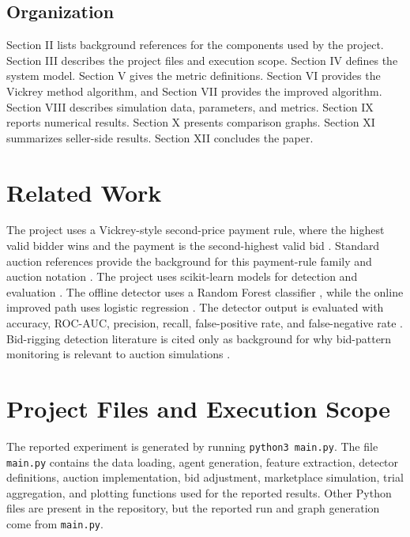 \documentclass[conference]{IEEEtran}
\begin{document}
\subsection{Organization}
Section II lists background references for the components used by the project. Section III describes the project files and execution scope. Section IV defines the system model. Section V gives the metric definitions. Section VI provides the Vickrey method algorithm, and Section VII provides the improved algorithm. Section VIII describes simulation data, parameters, and metrics. Section IX reports numerical results. Section X presents comparison graphs. Section XI summarizes seller-side results. Section XII concludes the paper.

\section{Related Work}
The project uses a Vickrey-style second-price payment rule, where the highest valid bidder wins and the payment is the second-highest valid bid \cite{b1}. Standard auction references provide the background for this payment-rule family and auction notation \cite{b4,b5,b6,b7,b8}. The project uses scikit-learn models for detection and evaluation \cite{b2}. The offline detector uses a Random Forest classifier \cite{b9}, while the online improved path uses logistic regression \cite{b10}. The detector output is evaluated with accuracy, ROC-AUC, precision, recall, false-positive rate, and false-negative rate \cite{b3}. Bid-rigging detection literature is cited only as background for why bid-pattern monitoring is relevant to auction simulations \cite{b11}.

\section{Project Files and Execution Scope}
The reported experiment is generated by running \texttt{python3 main.py}. The file \texttt{main.py} contains the data loading, agent generation, feature extraction, detector definitions, auction implementation, bid adjustment, marketplace simulation, trial aggregation, and plotting functions used for the reported results. Other Python files are present in the repository, but the reported run and graph generation come from \texttt{main.py}.
\end{document}
